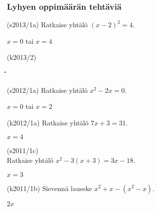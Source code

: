 \subsubsection*{Lyhyen oppimäärän tehtäviä}

\begin{tehtava}
(s2013/1a) Ratkaise yhtälö $(x-2)^2=4$.
\begin{vastaus}
$x=0$ tai $x=4$ 
\end{vastaus}
\end{tehtava}

\begin{tehtava}
(k2013/2)
\begin{vastaus}
\end{vastaus}
\end{tehtava}̈́

\begin{tehtava}
(s2012/1a) Ratkaise yhtälö $x^2-2x = 0$.
\begin{vastaus}
$x=0$ tai $x=2$
\end{vastaus}
\end{tehtava}

\begin{tehtava}
(k2012/1a) Ratkaise yhtälö $7x+3 = 31$.
\begin{vastaus}
$x = 4$
\end{vastaus}
\end{tehtava}

\begin{tehtava}
(s2011/1c) \\ Ratkaise yhtälö $x^2-3(x+3) = 3x-18$.
\begin{vastaus}
$x=3$
\end{vastaus}
\end{tehtava}


\begin{tehtava}
(k2011/1b) Sievennä lauseke $x^2+x-(x^2-x)$.
\begin{vastaus}
$2x$
\end{vastaus}
\end{tehtava}

